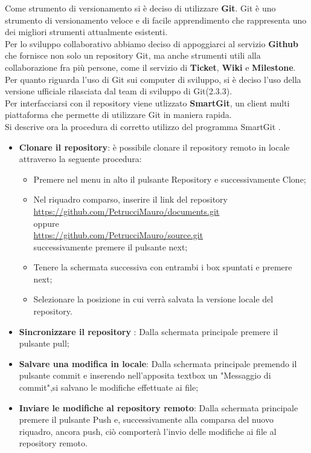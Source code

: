 Come strumento di versionamento si è deciso di utilizzare \textbf{Git}.
Git è uno strumento di versionamento veloce e di facile apprendimento che
rappresenta uno dei migliori strumenti attualmente esistenti.\\ Per lo sviluppo collaborativo abbiamo deciso di appoggiarci al servizio \textbf{Github} che fornisce non solo un repository Git, ma anche strumenti utili alla collaborazione fra più persone, come il servizio di \textbf{Ticket}, \textbf{Wiki} e \textbf{Milestone}.\\
Per quanto riguarda l’uso di Git sui computer di sviluppo, si è deciso l’uso
della versione ufficiale rilasciata dal team di sviluppo di Git(2.3.3).\\
Per interfacciarsi con il repository viene utlizzato \textbf{SmartGit}, un client multi piattaforma che permette di utilizzare Git in maniera rapida.\\
Si descrive ora la procedura di corretto utilizzo del programma SmartGit .
\begin{itemize}

\item 	\textbf{Clonare il repository}: è possibile clonare il repository remoto in locale attraverso la seguente procedura:

\begin{itemize}
\item Premere nel menu in alto il pulsante Repository e successivamente Clone;
\item Nel riquadro comparso, inserire il link del repository\\ \url{https://github.com/PetrucciMauro/documents.git}\\
oppure\\
\url{https://github.com/PetrucciMauro/source.git}\\
successivamente premere il pulsante  next;
\item Tenere la schermata successiva con entrambi i box spuntati e premere next;
\item Selezionare la posizione in cui verrà salvata la versione locale del repository.
\end{itemize}
\item \textbf{Sincronizzare il repository} : Dalla schermata principale premere il pulsante pull; 
\item \textbf{Salvare una modifica in locale}: Dalla schermata principale premendo il pulsante commit e inserendo nell'apposita textbox un "Messaggio di commit",si salvano le modifiche effettuate ai file;
\item \textbf{Inviare le modifiche al repository remoto}: Dalla schermata principale premere il pulsante Push e, successivamente alla comparsa del nuovo riquadro, ancora push, ciò comporterà l'invio delle modifiche ai file al repository remoto.

\end{itemize}

